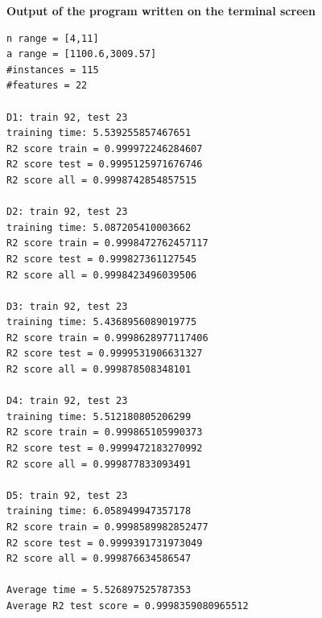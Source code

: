 \documentclass[11pt,titlepage,dvipdfmx,twoside]{article}
\begin{document}
\bigskip



\begin{oframed}
{\bf  Output of the program written on the terminal screen}\\
\begin{verbatim}
n range = [4,11]
a range = [1100.6,3009.57]
#instances = 115
#features = 22

D1: train 92, test 23
training time: 5.539255857467651
R2 score train = 0.999972246284607
R2 score test = 0.9995125971676746
R2 score all = 0.9998742854857515

D2: train 92, test 23
training time: 5.087205410003662
R2 score train = 0.9998472762457117
R2 score test = 0.999827361127545
R2 score all = 0.9998423496039506

D3: train 92, test 23
training time: 5.4368956089019775
R2 score train = 0.9998628977117406
R2 score test = 0.9999531906631327
R2 score all = 0.999878508348101

D4: train 92, test 23
training time: 5.512180805206299
R2 score train = 0.999865105990373
R2 score test = 0.9999472183270992
R2 score all = 0.999877833093491

D5: train 92, test 23
training time: 6.058949947357178
R2 score train = 0.9998589982852477
R2 score test = 0.9999391731973049
R2 score all = 0.999876634586547

Average time = 5.526897525787353
Average R2 test score = 0.9998359080965512
\end{verbatim}
\end{oframed}



\bigskip\bigskip



\end{document}
